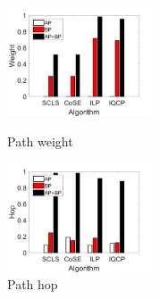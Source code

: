 \begin{figure}[tp]
\centering
\begin{minipage}[t]{0.45\linewidth}
\centering
\includegraphics[width=1.7in]{figures/weight}
\caption{Path weight}
\label{fig:normalization weitgh sum}
\end{minipage}
\hfill
\begin{minipage}[t]{0.45\linewidth}
\centering
\includegraphics[width=1.7in]{figures/hop}
\caption{Path hop}
\label{fig:normalization hop}
\end{minipage}
\end{figure}


